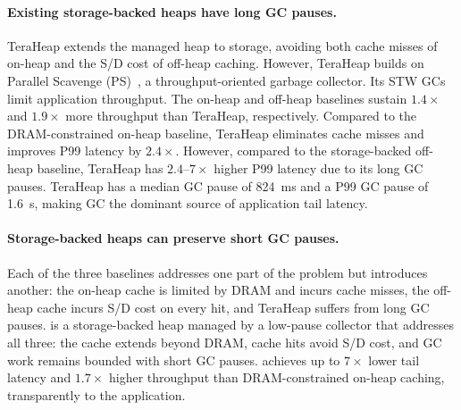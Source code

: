 \paragraph{\textbf{Existing storage-backed heaps have long GC pauses.}}
TeraHeap extends the managed heap to storage, avoiding both cache misses of on-heap and the S/D cost of off-heap caching.
However, TeraHeap builds on Parallel Scavenge (PS)~\cite{jones:gc_handbook}, a throughput-oriented garbage collector.
Its STW GCs limit application throughput.
The on-heap and off-heap baselines sustain $1.4\times$ and $1.9\times$ more throughput than TeraHeap, respectively.
Compared to the DRAM-constrained on-heap baseline, TeraHeap eliminates cache misses and improves P99 latency by $2.4\times$.
However, compared to the storage-backed off-heap baseline, TeraHeap has $2.4$--$7\times$ higher P99 latency due to its long GC pauses.
TeraHeap has a median GC pause of \SI{824}{ms} and a P99 GC pause of \SI{1.6}{s}, making GC the dominant source of application tail latency.

\paragraph{\textbf{Storage-backed heaps can preserve short GC pauses.}}
Each of the three baselines addresses one part of the problem but introduces another: the on-heap cache is limited by DRAM and incurs cache misses, the off-heap cache incurs S/D cost on every hit, and TeraHeap suffers from long GC pauses.
\chipperName{} is a storage-backed heap managed by a low-pause collector that addresses all three: the cache extends beyond DRAM, cache hits avoid S/D cost, and GC work remains bounded with short GC pauses.
\chipperName{} achieves up to $7\times$ lower tail latency and $1.7\times$ higher throughput than DRAM-constrained on-heap caching, transparently to the application.
